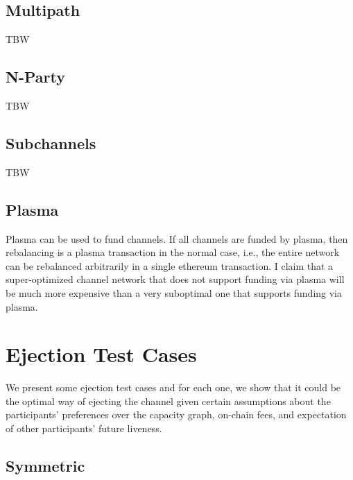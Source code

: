 \documentclass{article}
\begin{document}
\subsection*{Multipath}

TBW

\subsection*{N-Party}

TBW

\subsection*{Subchannels}

TBW

\subsection*{Plasma}

Plasma can be used to fund channels. If all channels are funded by plasma, then rebalancing is a plasma transaction in the normal case, i.e., the entire network can be rebalanced arbitrarily in a single ethereum transaction. I claim that a super-optimized channel network that does not support funding via plasma will be much more expensive than a very suboptimal one that supports funding via plasma.

\section*{Ejection Test Cases}

We present some ejection test cases and for each one, we show that it could be the optimal way of ejecting the channel given certain assumptions about the participants' preferences over the capacity graph, on-chain fees, and expectation of other participants' future liveness.

\subsection*{Symmetric}

\begin{figure}[H]
    \centering
\end{figure}
\end{document}
